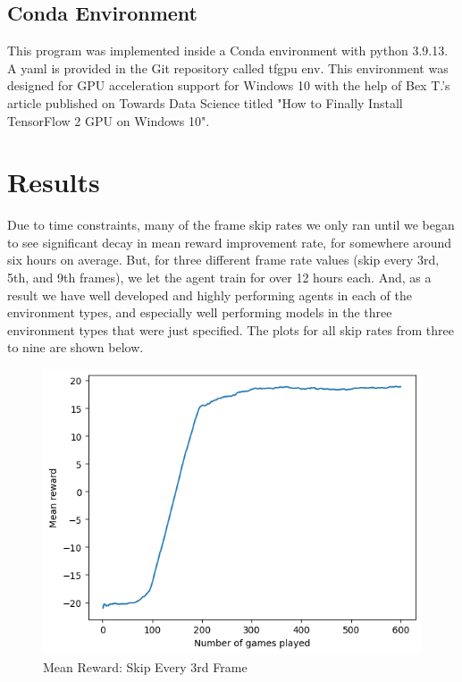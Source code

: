 \documentclass[12pt, a4paper, twocolumn]{article} %
\begin{document}
\subsection{Conda Environment}

This program was implemented inside a Conda environment with python 3.9.13. A yaml is provided in the Git repository called tfgpu env. This environment was designed for GPU acceleration support for Windows 10 with the help of Bex T.'s article published on Towards Data Science titled "How to Finally Install TensorFlow 2 GPU on Windows 10".



\section{Results}

Due to time constraints, many of the frame skip rates we only ran until we began to see significant decay in mean reward improvement rate, for somewhere around six hours on average. But, for three different frame rate values (skip every 3rd, 5th, and 9th frames), we let the agent train for over 12 hours each. And, as a result we have well developed and highly performing agents in each of the environment types, and especially well performing models in the three environment types that were just specified. The plots for all skip rates from three to nine are shown below.


\begin{figure}[H]
	\includegraphics[width=\linewidth]{mr_sk3.PNG} %
	\caption{Mean Reward: Skip Every 3rd Frame} %
\end{figure}
\end{document}
